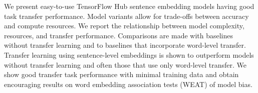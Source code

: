 We present easy-to-use TensorFlow Hub sentence embedding models having good task transfer performance. Model variants allow for trade-offs between accuracy and compute resources. We report the relationship between model complexity, resources, and transfer performance. Comparisons are made with baselines without transfer learning and to baselines that incorporate word-level transfer. Transfer learning using sentence-level embeddings is shown to outperform models without transfer learning and often those that use only word-level transfer. We show good transfer task performance with minimal training data and obtain encouraging results on word embedding association tests (WEAT) of model bias.
